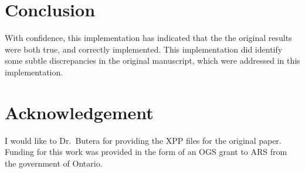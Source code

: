 \documentclass[10pt,a4paper,onecolumn]{article}
\begin{document}
\section{Conclusion}\label{conclusion}

With confidence, this implementation has indicated that the the original
results were both true, and correctly implemented. This implementation
did identify some subtle discrepancies in the original manuscript, which
were addressed in this implementation.

\section{Acknowledgement}\label{acknowledgement}

I would like to Dr.~Butera for providing the XPP files for the original
paper. Funding for this work was provided in the form of an OGS grant to
ARS from the government of Ontario.

{\sffamily \small
  \printbibliography[title=References]
}
\end{document}
